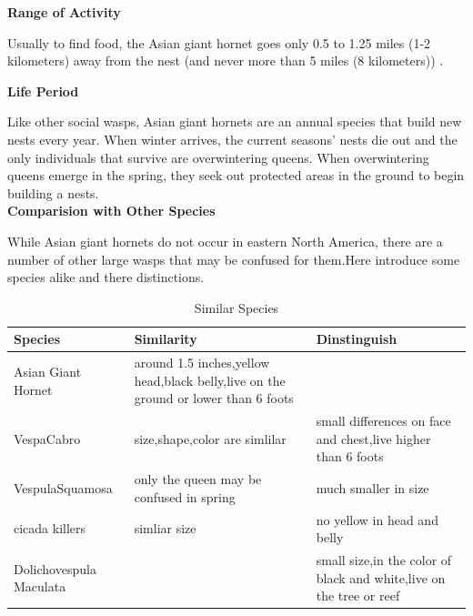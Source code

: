 \documentclass[12pt]{article}
\begin{document}
\textbf{Range of Activity }

Usually to find food, the Asian giant hornet goes only 0.5 to 1.25 miles (1-2 kilometers) away from the nest (and never more than 5 miles (8 kilometers)) .

\textbf{Life Period}

 Like other social wasps, Asian giant hornets are an annual species that build new nests every year. When winter arrives, the current seasons' nests die out and the only individuals that survive are overwintering queens. When overwintering queens emerge in the spring, they seek out protected areas in the ground to begin building a nests.
\quad\\
 
\textbf{Comparision with Other Species}

While Asian giant hornets do not occur in eastern North America, there are a number of other large wasps that may be confused for them.Here introduce some species alike and there distinctions.
\begin{table}  
	\caption{Similar Species}  
	\begin{center}  
		\begin{tabular}{|p{5cm}|p{7cm}| p{5cm}|}  
			\hline  
			Species & Similarity & Dinstinguish  \\ \hline  
			Asian Giant Hornet& around 1.5 inches,yellow head,black belly,live on the ground or lower than 6 foots&\\ \hline  
			VespaCabro & size,shape,color are simlilar &small differences on face and chest,live higher than 6 foots \\  
			\hline 
			VespulaSquamosa & only the queen may be confused in spring  &much smaller in size \\  
			\hline  
			cicada killers & simliar size  &no yellow in head and belly \\  
			\hline
			Dolichovespula Maculata &  &small size,in the color of black and white,live on the tree or reef\\  
			\hline
		\end{tabular}  
	\end{center}  
\end{table}
\end{document}
